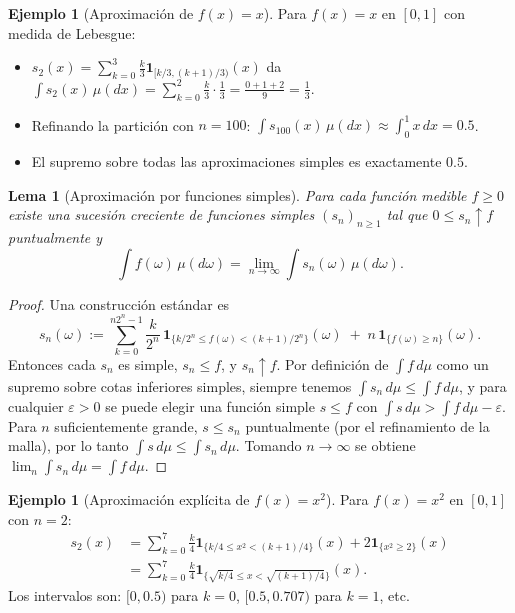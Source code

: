 \documentclass[11pt,a4paper]{article}
\theoremstyle{plain}
\newtheorem{lemma}[theorem]{Lema}
\theoremstyle{definition}
\newtheorem{example}[theorem]{Ejemplo}
\theoremstyle{remark}
\newcommand{\1}{\mathbf{1}}
\begin{document}
\begin{example}[Aproximación de $f(x)=x$]
Para $f(x)=x$ en $[0,1]$ con medida de Lebesgue:
\begin{itemize}
\item $s_2(x)=\sum_{k=0}^{3} \frac{k}{3}\1_{[k/3,(k+1)/3)}(x)$ da $\int s_2(x)\,\mu(dx) = \sum_{k=0}^{2} \frac{k}{3}\cdot\frac{1}{3} = \frac{0+1+2}{9} = \frac{1}{3}$.
\item Refinando la partición con $n=100$: $\int s_{100}(x)\,\mu(dx) \approx \int_0^1 x\,dx = 0.5$.
\item El supremo sobre todas las aproximaciones simples es exactamente $0.5$.
\end{itemize}
\end{example}

\begin{lemma}[Aproximación por funciones simples]
Para cada función medible $f\ge0$ existe una sucesión creciente de funciones simples $(s_n)_{n\ge1}$ tal que $0\le s_n\uparrow f$ puntualmente y
\[
\int f(\omega)\,\mu(d\omega)=\lim_{n\to\infty}\int s_n(\omega)\,\mu(d\omega).
\]
\end{lemma}

\begin{proof}
Una construcción estándar es
\[
s_n(\omega):=\sum_{k=0}^{n2^n-1}\frac{k}{2^n}\,\1_{\{k/2^n\le f(\omega)<(k+1)/2^n\}}(\omega)
\;+\; n\,\1_{\{f(\omega)\ge n\}}(\omega).
\]
Entonces cada $s_n$ es simple, $s_n\le f$, y $s_n\uparrow f$. Por definición de $\int f\,d\mu$ como un supremo sobre cotas inferiores simples, siempre tenemos $\int s_n\,d\mu\le\int f\,d\mu$, y para cualquier $\varepsilon>0$ se puede elegir una función simple $s\le f$ con $\int s\,d\mu>\int f\,d\mu-\varepsilon$. Para $n$ suficientemente grande, $s\le s_n$ puntualmente (por el refinamiento de la malla), por lo tanto $\int s\,d\mu\le\int s_n\,d\mu$. Tomando $n\to\infty$ se obtiene $\lim_n\int s_n\,d\mu=\int f\,d\mu$.
\end{proof}

\begin{example}[Aproximación explícita de $f(x)=x^2$]
Para $f(x)=x^2$ en $[0,1]$ con $n=2$:
\begin{align*}
s_2(x) &= \sum_{k=0}^{7} \frac{k}{4}\1_{\{k/4\le x^2 < (k+1)/4\}}(x) + 2\1_{\{x^2\ge 2\}}(x) \\
&= \sum_{k=0}^{7} \frac{k}{4}\1_{\{\sqrt{k/4}\le x < \sqrt{(k+1)/4}\}}(x).
\end{align*}
Los intervalos son: $[0,0.5)$ para $k=0$, $[0.5,0.707)$ para $k=1$, etc.
\end{example}
\end{document}
